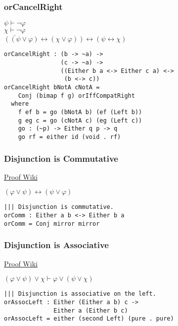\documentclass{acm_proc_article-sp}
\renewcommand{\iff}{\leftrightarrow}
\begin{document}
\newpage

\subsubsection{orCancelRight}\label{orcancelright}

\(\psi \vdash \neg \varphi\)\\
\(\underline{\chi \vdash \neg \varphi}\)\\
\(((\psi \lor \varphi) \iff (\chi \lor \varphi)) \iff (\psi \iff \chi)\)

\begin{verbatim}
orCancelRight : (b -> ~a) ->
                (c -> ~a) ->
                ((Either b a <-> Either c a) <->
                 (b <-> c))
orCancelRight bNotA cNotA =
    Conj (bimap f g) orIffCompatRight
  where
    f ef b = go (bNotA b) (ef (Left b))
    g eg c = go (cNotA c) (eg (Left c))
    go : (~p) -> Either q p -> q
    go rf = either id (void . rf)
\end{verbatim}

\subsubsection{Disjunction is
Commutative}\label{disjunction-is-commutative}

\href{https://proofwiki.org/wiki/Rule_of_Commutation/Disjunction}{Proof
Wiki}

\((\varphi \lor \psi) \iff (\psi \lor \varphi)\)

\begin{verbatim}
||| Disjunction is commutative.
orComm : Either a b <-> Either b a
orComm = Conj mirror mirror
\end{verbatim}

\subsubsection{Disjunction is
Associative}\label{disjunction-is-associative}

\href{https://proofwiki.org/wiki/Rule_of_Association/Disjunction}{Proof
Wiki}

\((\varphi \lor \psi) \lor \chi \vdash \varphi \lor (\psi \lor \chi)\)

\begin{verbatim}
||| Disjunction is associative on the left.
orAssocLeft : Either (Either a b) c ->
              Either a (Either b c)
orAssocLeft = either (second Left) (pure . pure)
\end{verbatim}
\end{document}
